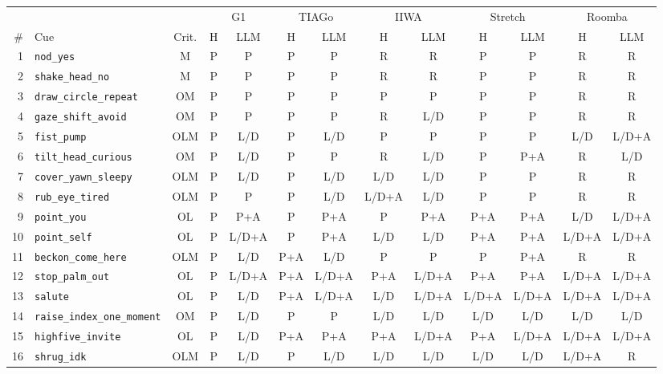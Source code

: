 \begin{table}[t]
\centering
\scriptsize
\setlength{\tabcolsep}{3.2pt}
\renewcommand{\arraystretch}{0.92}
\begin{tabular}{@{}r l c cc cc cc cc cc@{}}
\toprule
& & & \multicolumn{2}{c}{G1} & \multicolumn{2}{c}{TIAGo} & \multicolumn{2}{c}{IIWA} & \multicolumn{2}{c}{Stretch} & \multicolumn{2}{c}{Roomba} \\
\cmidrule(lr){4-5}\cmidrule(lr){6-7}\cmidrule(lr){8-9}\cmidrule(lr){10-11}\cmidrule(l){12-13}
\# & Cue & Crit. & H & LLM & H & LLM & H & LLM & H & LLM & H & LLM \\
\midrule
1 & \texttt{nod\_yes} & M & P & P & P & P & R & R & P & P & R & R \\
2 & \texttt{shake\_head\_no} & M & P & P & P & P & R & R & P & P & R & R \\
3 & \texttt{draw\_circle\_repeat} & OM & P & P & P & P & P & P & P & P & R & R \\
4 & \texttt{gaze\_shift\_avoid} & OM & P & P & P & P & R & L/D & P & P & R & R \\
5 & \texttt{fist\_pump} & OLM & P & L/D & P & L/D & P & P & P & P & L/D & L/D+A \\
6 & \texttt{tilt\_head\_curious} & OM & P & L/D & P & P & R & L/D & P & P+A & R & L/D \\
7 & \texttt{cover\_yawn\_sleepy} & OLM & P & L/D & P & L/D & L/D & L/D & P & P & R & R \\
8 & \texttt{rub\_eye\_tired} & OLM & P & P & P & L/D & L/D+A & L/D & P & P & R & R \\
9 & \texttt{point\_you} & OL & P & P+A & P & P+A & P & P+A & P+A & P+A & L/D & L/D+A \\
10 & \texttt{point\_self} & OL & P & L/D+A & P & P+A & L/D & L/D & P+A & P+A & L/D+A & L/D+A \\
11 & \texttt{beckon\_come\_here} & OLM & P & L/D & P+A & L/D & P & P & P & P+A & R & R \\
12 & \texttt{stop\_palm\_out} & OL & P & L/D+A & P+A & L/D+A & P+A & L/D+A & P+A & P+A & L/D+A & L/D+A \\
13 & \texttt{salute} & OL & P & L/D & P+A & L/D+A & L/D & L/D+A & L/D+A & L/D+A & L/D+A & L/D+A \\
14 & \texttt{raise\_index\_one\_moment} & OM & P & L/D & P & P & L/D & L/D & L/D & L/D & L/D & L/D \\
15 & \texttt{highfive\_invite} & OL & P & L/D & P+A & P+A & P+A & L/D+A & P+A & L/D+A & L/D+A & L/D+A \\
16 & \texttt{shrug\_idk} & OLM & P & L/D & P & L/D & L/D & L/D & L/D & L/D & L/D+A & R \\

\end{tabular}
\end{table}
